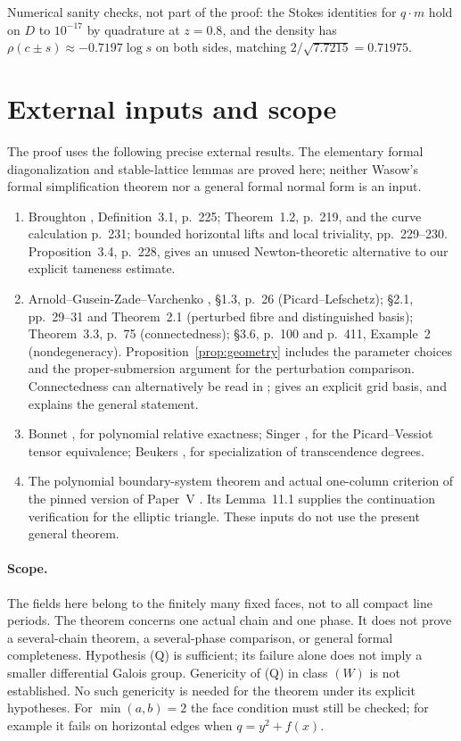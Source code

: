 \documentclass[11pt]{article}
\numberwithin{equation}{section}
\theoremstyle{definition}
\theoremstyle{remark}
\begin{document}
Numerical sanity checks, not part of the proof: the Stokes identities for
$q\cdot m$ hold on $D$ to $10^{-17}$ by quadrature at $z=0.8$, and the density
has $\rho(c\pm s)\approx-0.7197\log s$ on both sides, matching
$2/\sqrt{7.7215}=0.71975$.

\section{External inputs and scope}\label{sec:inputs}
The proof uses the following precise external results. The elementary
formal diagonalization and stable-lattice lemmas are proved here; neither
Wasow's formal simplification theorem nor a general formal normal form is
an input.
\begin{enumerate}[leftmargin=2.2em]
\item Broughton \cite{Br}, Definition~3.1, p.~225; Theorem~1.2, p.~219,
 and the curve calculation p.~231; bounded horizontal lifts and local
 triviality, pp.~229--230. Proposition~3.4, p.~228, gives an unused
 Newton-theoretic alternative to our explicit tameness estimate.
\item Arnold--Gusein-Zade--Varchenko \cite{AGV}, \S1.3, p.~26
 (Picard--Lefschetz); \S2.1, pp.~29--31 and Theorem~2.1
 (perturbed fibre and distinguished basis); Theorem~3.3, p.~75
 (connectedness); \S3.6, p.~100 and p.~411, Example~2
 (nondegeneracy). Proposition~\ref{prop:geometry} includes the parameter
 choices and the proper-submersion argument for the perturbation comparison.
 Connectedness can alternatively be read in \cite[Theorem~2, p.~274]{La};
 \cite[Corollary~4, p.~27]{Ga} gives an explicit grid basis, and
 \cite[Theorem~17, Corollary~18]{Eb} explains the general statement.
\item Bonnet \cite[Definitions~1.3--1.4 and Theorem~1.5, p.~375]{Bonnet},
 for polynomial relative exactness; Singer \cite[Theorem~1.5.2]{Singer},
 for the Picard--Vessiot tensor equivalence; Beukers
 \cite[Theorem~1.1, p.~370]{Beukers}, for specialization of
 transcendence degrees.
\item The polynomial boundary-system theorem and actual one-column
 criterion of the pinned version of Paper~V \cite[Theorems~2.1 and~8.2]{PaperV}.
 Its Lemma~11.1 supplies the continuation verification for the elliptic
 triangle. These inputs do not use the present general theorem.
\end{enumerate}

\paragraph{Scope.} The fields here belong to the finitely many fixed faces,
not to all compact line periods. The theorem concerns one actual chain and
one phase. It does not prove a several-chain theorem, a several-phase
comparison, or general formal completeness. Hypothesis (Q) is sufficient;
its failure alone does not imply a smaller differential Galois group.
Genericity of (Q) in class $(W)$ is not established. No such genericity is
needed for the theorem under its explicit hypotheses.
For $\min(a,b)=2$ the face condition must still be checked; for example it
fails on horizontal edges when $q=y^2+f(x)$.
\end{document}
